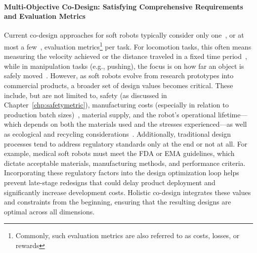 \paragraph{Multi-Objective Co-Design: Satisfying Comprehensive Requirements and Evaluation Metrics}
Current co-design approaches for soft robots typically consider only one~\citep{spielberg2019learning, spielberg2021co, medvet2022impact, wang2023preco, wang2024diffusebot, navez2024design}, or at most a few~\citep{navez2025modeling}, evaluation metrics\footnote{Commonly, such evaluation metrics are also referred to as costs, losses, or rewards} per task. For locomotion tasks, this often means measuring the velocity achieved or the distance traveled in a fixed time period~\citep{spielberg2019learning, wang2023preco}, while in manipulation tasks (e.g., pushing), the focus is on how far an object is safely moved~\citep{wang2024diffusebot}. However, as soft robots evolve from research prototypes into commercial products, a broader set of design values becomes critical. These include, but are not limited to, safety (as discussed in Chapter~\ref{chp:safetymetric}), manufacturing costs (especially in relation to production batch sizes)~\citep{miriyev2017soft, schmitt2018soft, majidi2014soft, junge2022leveraging}, material supply, and the robot’s operational lifetime—which depends on both the materials used and the stresses experienced—as well as ecological and recycling considerations~\citep{mazzolai2020vision}. Additionally, traditional design processes tend to address regulatory standards only at the end or not at all. For example, medical soft robots must meet the FDA or EMA guidelines, which dictate acceptable materials, manufacturing methods, and performance criteria. Incorporating these regulatory factors into the design optimization loop helps prevent late-stage redesigns that could delay product deployment and significantly increase development costs. Holistic co-design integrates these values and constraints from the beginning, ensuring that the resulting designs are optimal across all dimensions.

